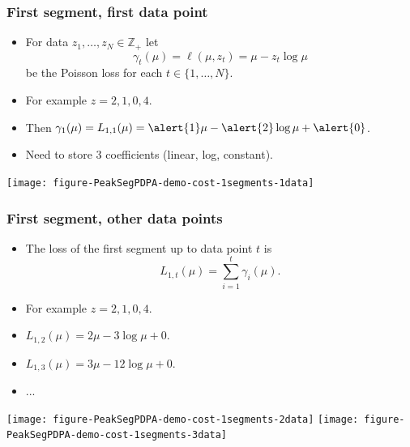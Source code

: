 \documentclass{beamer}
\newcommand{\ZZ}{\mathbb Z}
\begin{document}
\begin{frame}
  \frametitle{First segment, first data point}
  \begin{itemize}
  \item For data $z_1, \dots, z_N\in\ZZ_+$ let
  \begin{equation*}
    \gamma_t(\mu) = \ell(\mu, z_t) = \mu - z_t \log \mu
  \end{equation*}
  be the Poisson loss for each $t\in\{1, \dots, N\}$.
\item For example $z = 2, 1, 0, 4$.
\item Then $\gamma_1(\mu)=L_{1,1}(\mu)= \alert{1}\mu - \alert{2}\log \mu + \alert{0}$.
\item Need to store 3 coefficients (\alert{linear}, \alert{log}, \alert{constant}).
  \end{itemize}
  \begin{center}
    \texttt{[image: figure-PeakSegPDPA-demo-cost-1segments-1data]}
  \end{center}
\end{frame}

\begin{frame}
  \frametitle{First segment, other data points}
  \begin{itemize}
\item
  The loss of the first segment up to data point $t$ is
  \begin{equation*}
    \label{eq:C1b}
    L_{1,t}(\mu) = \sum_{i=1}^t \gamma_i(\mu).
  \end{equation*}
\item For example $z = 2, 1, 0, 4$.
\item $L_{1,2}(\mu) = 2\mu - 3\log\mu + 0$.
\item $L_{1,3}(\mu) = 3\mu - 12\log\mu + 0$.
\item ...
  \end{itemize}
  \begin{center}
    \texttt{[image: figure-PeakSegPDPA-demo-cost-1segments-2data]}
    \texttt{[image: figure-PeakSegPDPA-demo-cost-1segments-3data]}
  \end{center}
\end{frame}
\end{document}
